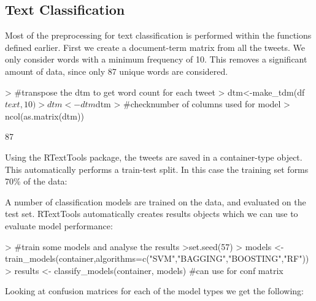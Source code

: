 \documentclass[10pt]{article}
\begin{document}
\subsection{Text Classification}
Most of the preprocessing for text classification is performed within the functions defined earlier. First we create a document-term matrix from all the tweets. We only consider words with a minimum frequency of 10. This removes a significant amount of data, since only 87 unique words are considered.
\hspace{1cm} 
\begin{Schunk}
\begin{Sinput}
> #transpose the dtm to get word count for each tweet
> dtm<-make_tdm(df$text,10)
> dtm<-dtm$dtm
> #checknumber of columns used for model
> ncol(as.matrix(dtm))
\end{Sinput}
\begin{Soutput}
[1] 87
\end{Soutput}
\end{Schunk}
\hspace{1cm} 
Using the RTextTools package, the tweets are saved in a container-type object. This automatically performs a train-test split. In this case the training set forms 70\% of the data:
\hspace{1cm} 
\begin{Schunk}
\end{Schunk}
\hspace{1cm} 
A number of classification models are trained on the data, and evaluated on the test set. RTextTools automatically creates results objects which we can use to evaluate model performance:
\hspace{1cm} 
\begin{Schunk}
\begin{Sinput}
> #train some models and analyse the results
>set.seed(57)
> models <- train_models(container,algorithms=c("SVM","BAGGING","BOOSTING","RF"))
> results <- classify_models(container, models) #can use for conf matrix

\end{Sinput}
\end{Schunk}
\hspace{1cm} 
Looking at confusion matrices for each of the model types we get the following:
\end{document}
